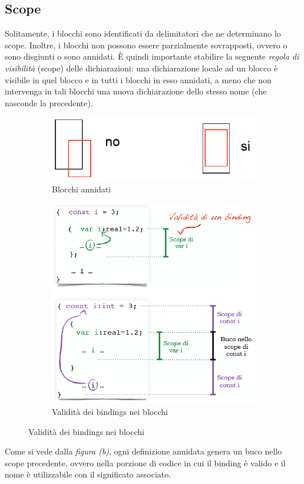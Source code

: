 \documentclass[a4paper,oneside,titlepage]{book}
\begin{document}
\subsection{Scope}
Solitamente, i blocchi sono identificati da delimitatori che ne determinano lo scope. Inoltre, i blocchi non possono essere parzialmente sovrapposti, ovvero o sono disgiunti o sono annidati. È quindi importante stabilire la seguente \textit{regola di visibilità} (scope) delle dichiarazioni: una dichiarazione locale ad un blocco è visibile in quel blocco e in tutti i blocchi in esso annidati, a meno che non intervenga in tali blocchi una nuova dichiarazione dello stesso nome (che nasconde la precedente).
\begin{figure}[htp]
	\begin{subfigure}{0.49\textwidth}
		\includegraphics[width=\textwidth, height=\textheight, keepaspectratio]{blocchi1.png} 
		\caption{Blocchi annidati}
	\end{subfigure}
	\hfill
	\begin{subfigure}{0.49\textwidth}
		\includegraphics[width=\textwidth, height=\textheight, keepaspectratio]{blocchi2.png}
		\caption{Validità dei bindings nei blocchi}
	\end{subfigure}
\end{figure}
\newpage
\noindent
Come si vede dalla \textit{figura (b)}, ogni definizione annidata genera un buco nello scope precedente, ovvero nella porzione di codice in cui il binding è valido e il nome è utilizzabile con il significato associato.
\end{document}
